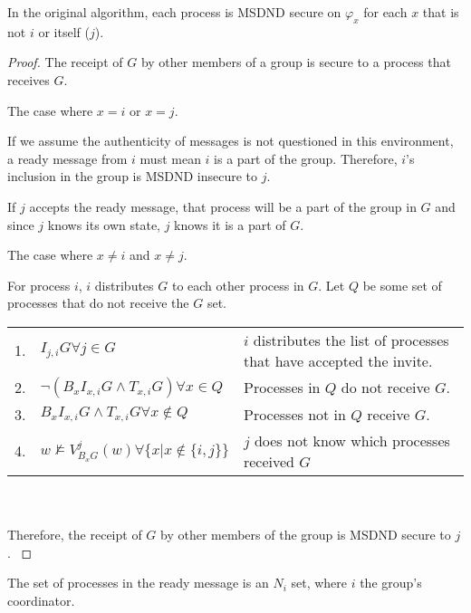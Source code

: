 \begin{thm}
    In the original algorithm, each process is MSDND secure on $\varphi_x$ for each $x$ that is not $i$ or itself ($j$).
\end{thm}

\begin{proof}
    The receipt of $G$ by other members of a group is secure to a process that receives $G$.
\begin{case}
    The case where $x = i$ or $x = j$.
\end{case}

If we assume the authenticity of messages is not questioned in this environment, a ready message from $i$ must mean $i$ is a part of the group.
Therefore, $i$'s inclusion in the group is MSDND insecure to $j$.

If $j$ accepts the ready message, that process will be a part of the group in $G$ and since $j$ knows its own state, $j$ knows it is a part of $G$.

\begin{case}
    The case where $x \neq i$ and $x \neq j$.
\end{case}

For process $i$, $i$ distributes $G$ to each other process in $G$.
Let $Q$ be some set of processes that do not receive the $G$ set.

\begin{table}[h!]
\centering
\small
\begin{tabularx}{\linewidth}{l X X}
1. & $I_{j,i} G \forall j \in G $ & $i$ distributes the list of processes that have accepted the invite.  \\
2. & $\neg(B_x I_{x,i} G \wedge T_{x,i} G) \forall x \in Q$ & Processes in $Q$ do not receive $G$. \\
3. & $B_x I_{x,i} G \wedge T_{x,i} G \forall x \not \in Q$ & Processes not in $Q$ receive $G$. \\
    4. & $w \not \vDash V_{B_x G}^{j}(w) \forall \{x | x \not \in \{i,j\}\}$ & $j$ does not know which processes received $G$ \\
\end{tabularx} \\~\\
Therefore, the receipt of $G$ by other members of the group is MSDND secure to $j$.
\label{tab:readynsetproof}
\end{table}
\end{proof}

\begin{cor}
    The set of processes in the ready message is an $N_i$ set, where $i$ the group's coordinator.
\end{cor}

